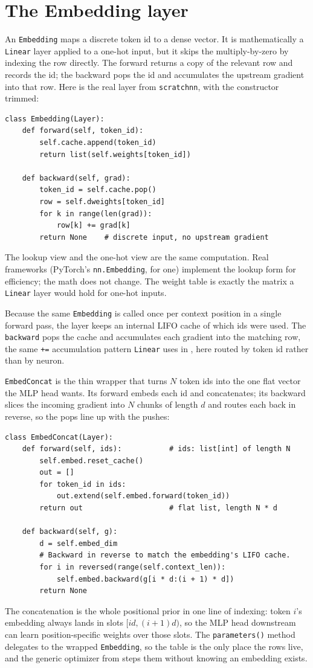 \section{The Embedding layer}\label{sec:embedding-layer}

An \texttt{Embedding} maps a discrete token id to a dense vector. It is
mathematically a \texttt{Linear} layer applied to a one-hot input, but it
skips the multiply-by-zero by indexing the row directly. The forward
returns a copy of the relevant row and records the id; the backward pops
the id and accumulates the upstream gradient into that row. Here is the
real layer from \texttt{scratchnn}, with the constructor trimmed:
\begin{lstlisting}
class Embedding(Layer):
    def forward(self, token_id):
        self.cache.append(token_id)
        return list(self.weights[token_id])

    def backward(self, grad):
        token_id = self.cache.pop()
        row = self.dweights[token_id]
        for k in range(len(grad)):
            row[k] += grad[k]
        return None    # discrete input, no upstream gradient
\end{lstlisting}
The lookup view and the one-hot view are the same computation. Real
frameworks (PyTorch's \texttt{nn.Embedding}, for one) implement the lookup
form for efficiency; the math does not change. The weight table is exactly
the matrix a \texttt{Linear} layer would hold for one-hot inputs.

Because the same \texttt{Embedding} is called once per context position in
a single forward pass, the layer keeps an internal LIFO cache of which ids
were used. The \texttt{backward} pops the cache and accumulates each
gradient into the matching row, the same \texttt{+=} accumulation pattern
\texttt{Linear} uses in , here routed by token id
rather than by neuron.

\texttt{EmbedConcat} is the thin wrapper that turns $N$ token ids into the
one flat vector the MLP head wants. Its forward embeds each id and
concatenates; its backward slices the incoming gradient into $N$ chunks of
length $d$ and routes each back in reverse, so the pops line up with the
pushes:
\begin{lstlisting}
class EmbedConcat(Layer):
    def forward(self, ids):           # ids: list[int] of length N
        self.embed.reset_cache()
        out = []
        for token_id in ids:
            out.extend(self.embed.forward(token_id))
        return out                    # flat list, length N * d

    def backward(self, g):
        d = self.embed_dim
        # Backward in reverse to match the embedding's LIFO cache.
        for i in reversed(range(self.context_len)):
            self.embed.backward(g[i * d:(i + 1) * d])
        return None
\end{lstlisting}
The concatenation is the whole positional prior in one line of indexing:
token $i$'s embedding always lands in slots $[id, (i+1)d)$, so the MLP head
downstream can learn position-specific weights over those slots. The
\texttt{parameters()} method delegates to the wrapped \texttt{Embedding},
so the table is the only place the rows live, and the generic optimizer
from  steps them without knowing an embedding exists.
